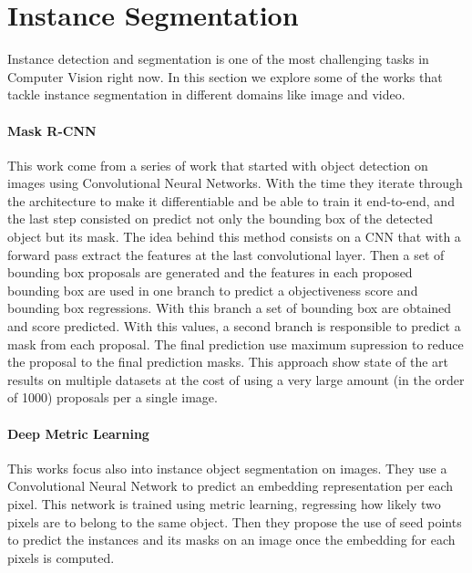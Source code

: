 

\section{Instance Segmentation}
\label{sec:soa_instancesegmentation}

Instance detection and segmentation is one of the most challenging tasks in Computer Vision right now.
In this section we explore some of the works that tackle instance segmentation in different domains like image and video.

\paragraph{Mask R-CNN~\cite{he2017mask}}
This work come from a series of work that started with object detection on images using Convolutional Neural Networks.
With the time they iterate through the architecture to make it differentiable and be able to train it end-to-end, and the last step consisted on predict not only the bounding box of the detected object but its mask.
The idea behind this method consists on a CNN that with a forward pass extract the features at the last convolutional layer.
Then a set of bounding box proposals are generated and the features in each proposed bounding box are used in one branch to predict a objectiveness score and bounding box regressions.
With this branch a set of bounding box are obtained and score predicted. With this values, a second branch is responsible to predict a mask from each proposal.
The final prediction use maximum supression to reduce the proposal to the final prediction masks.
This approach show state of the art results on multiple datasets at the cost of using a very large amount (in the order of 1000) proposals per a single image.

\paragraph{Deep Metric Learning~\cite{fathi2017semantic}}
This works focus also into instance object segmentation on images.
They use a Convolutional Neural Network to predict an embedding representation per each pixel.
This network is trained using metric learning, regressing how likely two pixels are to belong to the same object.
Then they propose the use of seed points to predict the instances and its masks on an image once the embedding for each pixels is computed.

